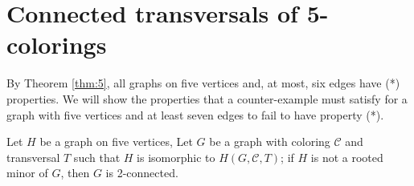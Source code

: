 \chapter{Connected transversals of 5-colorings}
By Theorem \ref{thm:5}, all graphs on five vertices and, at most, six edges have (*) properties. 
We will show the properties that a counter-example must satisfy for a graph with five vertices and at least seven edges to fail to have property (*).

\begin{lemma}
 Let $H$ be a graph on five vertices, Let $G$ be a graph with coloring $\mathcal{C}$ and transversal $T$ such that $H$ is isomorphic to $H(G, \mathcal{C}, T)$;
 if $H$ is not a rooted minor of $G$, then $G$ is 2-connected.
\end{lemma}

